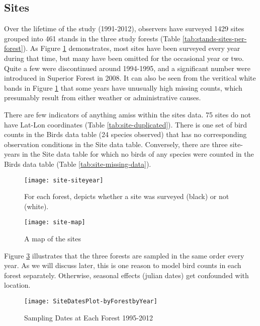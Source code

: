 \subsection{Sites}

Over the lifetime of the study (1991-2012), observers have surveyed 1429 sites grouped into 461 stands in the three study forests (Table \ref{tab:stands-sites-per-forest}).  As Figure \ref{fig:site-siteyear} demonstrates, most sites have been surveyed every year during that time, but many have been omitted for the occasional year or two.  Quite a few were discontinued around 1994-1995, and a significant number were introduced in Superior Forest in 2008.  It can also be seen from the veritical white bands in Figure \ref{fig:site-siteyear} that some years have unusually high missing counts, which presumably result from either weather or administrative causes.\par
There are few indicators of anything amiss within the sites data.  75 sites do not have Lat-Lon coordinates (Table \ref{tab:site-duplicated}).  There is one set of bird counts in the Birds data table (24 species observed) that has no corresponding observation conditions in the Site data table.  Conversely, there are three site-years in the Site data table for which no birds of any species were counted in the Birds data table (Table \ref{tab:site-missing-data}).

\begin{figure}
\texttt{[image: site-siteyear]}
\caption{For each forest, depicts whether a site was surveyed (black) or not (white).}
\label{fig:site-siteyear}
\end{figure}







\begin{figure}
\texttt{[image: site-map]}
\caption{A map of the sites}
\label{fig:site-map}
\end{figure}

Figure \ref{fig:SiteDatesPlot-byForestbyYear} illustrates that the three forests are sampled in the same order every year.  As we will discuss later, this is one reason to model bird counts in each forest separately.  Otherwise, seasonal effects (julian dates) get confounded with location.

\begin{figure}
\texttt{[image: SiteDatesPlot-byForestbyYear]}
\caption{Sampling Dates at Each Forest 1995-2012}
\label{fig:SiteDatesPlot-byForestbyYear}
\end{figure}


